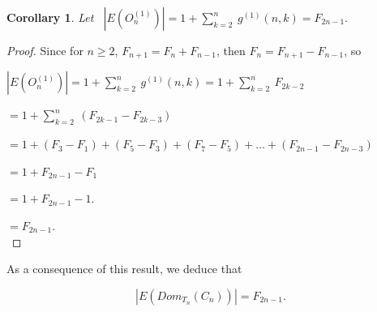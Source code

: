 \documentclass[10pt]{extarticle}
\numberwithin{equation}{section}
\numberwithin{bbb}{section}
\newtheorem{corollary}{Corollary}[section]
\numberwithin{equation}{section}
\begin{document}
\vspace{1cm}
\begin{corollary}
 Let \ $|E(O_n^{(1)})|=1+\sum_{k=2}^{n} \ g^{(1)}(n,k)=F_{2n-1}.$  
\end{corollary}

\begin{proof}
Since for $n \geq 2$, $F_{n+1}=F_{n}+F_{n-1}$, then $F_{n}=F_{n+1}-F_{n-1}$, so 

\vspace{0.9cm}
$|E(O_n^{(1)})|=1+\sum_{k=2}^{n} \ g^{(1)}(n,k)=1+\sum_{k=2}^{n} \ F_{2k-2}$

 \vspace{0.7cm}
 \hspace{4.9cm}
 $=1+\sum_{k=2}^{n} \ (F_{2k-1}-F_{2k-3})$

\vspace{0.7cm}
 \hspace{4.9cm}
 $=1+(F_{3}-F_{1})+(F_{5}-F_{3})+(F_{7}-F_{5})+\dots+(F_{2n-1}-F_{2n-3})$
 
\vspace{0.7cm}
  \hspace{4.9cm}
 $=1+F_{2n-1}-F_{1}$

\vspace{0.7cm}
 \hspace{4.9cm}
 $=1+F_{2n-1}-1$.

\vspace{0.7cm}
\hspace{4.9cm}
 $=F_{2n-1}$.\\
\end{proof}

\vspace{0.5cm}
As a consequence of this result, we deduce that 

 $$|E(Dom_{T_n}(C_n))|=F_{2n-1}.$$   
\end{document}
